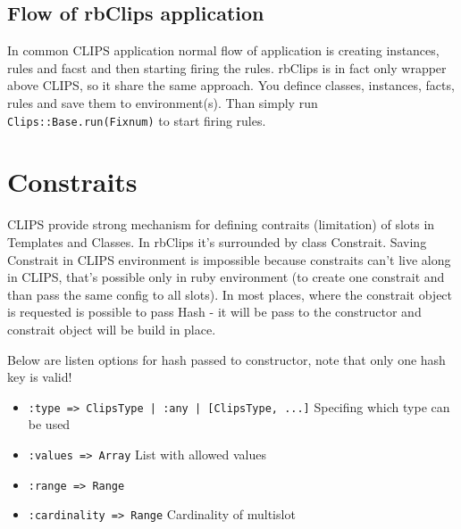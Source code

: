 \documentclass[a4paper,10pt]{article}
\begin{document}
\subsection{Flow of rbClips application}
In common CLIPS application normal flow of application is creating instances, rules and facst and then starting firing the rules. rbClips is in fact only wrapper above CLIPS, so it share the same approach. You defince classes, instances, facts, rules and save them to environment(s). Than simply run \texttt{Clips::Base.run(Fixnum)} to start firing rules.

\section{Constraits}
CLIPS provide strong mechanism for defining contraits (limitation) of slots in Templates and Classes. In rbClips it's surrounded by class Constrait. Saving Constrait in CLIPS environment is impossible because constraits can't live along in CLIPS, that's possible only in ruby environment (to create one constrait and than pass the same config to all slots). In most places, where the constrait object is requested is possible to pass Hash - it will be pass to the constructor and constrait object will be build in place.

Below are listen options for hash passed to constructor, note that only one hash key is valid!
\begin{itemize}
 \item \texttt{:type => ClipsType | :any | [ClipsType, ...]} Specifing which type can be used
 \item \texttt{:values => Array} List with allowed values
 \item \texttt{:range => Range}
 \item \texttt{:cardinality => Range} Cardinality of multislot
\end{itemize}

\end{document}
